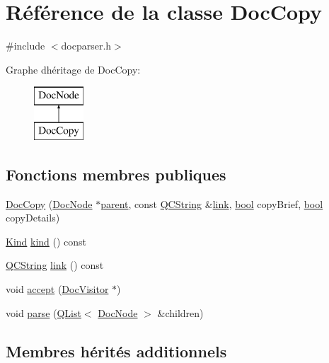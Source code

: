 \hypertarget{class_doc_copy}{}\section{Référence de la classe Doc\+Copy}
\label{class_doc_copy}


{\ttfamily \#include $<$docparser.\+h$>$}

Graphe d\textquotesingle{}héritage de Doc\+Copy\+:\begin{figure}[H]
\begin{center}
\leavevmode
\includegraphics[height=2.000000cm]{class_doc_copy}
\end{center}
\end{figure}
\subsection*{Fonctions membres publiques}
\begin{DoxyCompactItemize}
\item 
\hyperlink{class_doc_copy_acd88cf1e2b750a84de520db1539136fb}{Doc\+Copy} (\hyperlink{class_doc_node}{Doc\+Node} $\ast$\hyperlink{class_doc_node_a990d8b983962776a647e6231d38bd329}{parent}, const \hyperlink{class_q_c_string}{Q\+C\+String} \&\hyperlink{class_doc_copy_ac9a0bf25fdda1b8b9fffdecad6173c3e}{link}, \hyperlink{qglobal_8h_a1062901a7428fdd9c7f180f5e01ea056}{bool} copy\+Brief, \hyperlink{qglobal_8h_a1062901a7428fdd9c7f180f5e01ea056}{bool} copy\+Details)
\item 
\hyperlink{class_doc_node_aebd16e89ca590d84cbd40543ea5faadb}{Kind} \hyperlink{class_doc_copy_a5c3a1f4707d25e4fdf42b3e8b4e0b0f5}{kind} () const 
\item 
\hyperlink{class_q_c_string}{Q\+C\+String} \hyperlink{class_doc_copy_ac9a0bf25fdda1b8b9fffdecad6173c3e}{link} () const 
\item 
void \hyperlink{class_doc_copy_a9b719f84800b76fcb9d441b9b64245d0}{accept} (\hyperlink{class_doc_visitor}{Doc\+Visitor} $\ast$)
\item 
void \hyperlink{class_doc_copy_a75619f5170d53a67f7028123e4ab18b8}{parse} (\hyperlink{class_q_list}{Q\+List}$<$ \hyperlink{class_doc_node}{Doc\+Node} $>$ \&children)
\end{DoxyCompactItemize}
\subsection*{Membres hérités additionnels}


